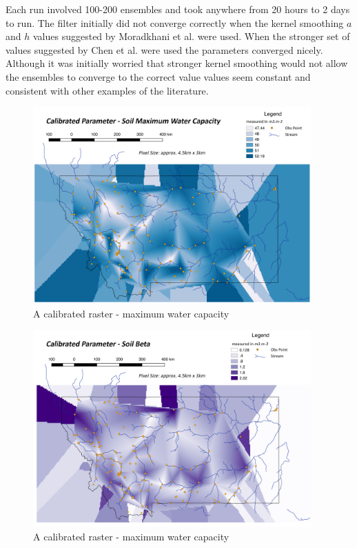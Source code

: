 Each run involved 100-200 ensembles and took anywhere from 20 hours to 2 days to run. The filter initially did not converge correctly when the kernel smoothing $a$ and $h$ values suggested by Moradkhani et al. were used. When the stronger set of values suggested by Chen et al. \cite{Chen2008} were used the parameters converged nicely. Although it was initially worried that stronger kernel smoothing would not allow the ensembles to converge to the correct value values seem constant and consistent with other examples of the literature.

\begin{figure}[h]
    \centering
    \includegraphics[width=0.95\textwidth]{max_wat}
    \caption{A calibrated raster - maximum water capacity}
    \label{fig:max_wat}
\end{figure} 

\begin{figure}[h]
    \centering
    \includegraphics[width=0.95\textwidth]{soil_beta}
    \caption{A calibrated raster - maximum water capacity}
    \label{fig:soil_beta}
\end{figure} 

